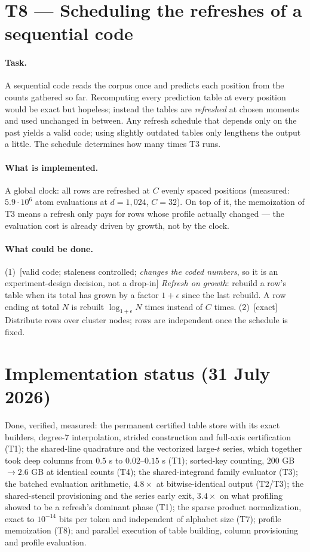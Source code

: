 \documentclass[11pt]{article}
\newcommand{\field}[1]{\paragraph{#1.}}
\begin{document}
\section{T8 --- Scheduling the refreshes of a sequential code}

\field{Task}
A sequential code reads the corpus once and predicts each position
from the counts gathered so far.  Recomputing every prediction table
at every position would be exact but hopeless; instead the tables
are \emph{refreshed} at chosen moments and used unchanged in
between.  Any refresh schedule that depends only on the past yields
a valid code; using slightly outdated tables only lengthens the
output a little.  The schedule determines how many times T3 runs.

\field{What is implemented}
A global clock: all rows are refreshed at $C$ evenly spaced
positions (measured: $5.9\cdot 10^6$ atom evaluations at
$d = 1{,}024$, $C = 32$).  On top of it, the memoization of T3 means
a refresh only pays for rows whose profile actually changed --- the
evaluation cost is already driven by growth, not by the clock.

\field{What could be done}
(1)~[valid code; staleness controlled; \emph{changes the coded
numbers}, so it is an experiment-design decision, not a drop-in]
\emph{Refresh on growth}: rebuild a row's table when its total has
grown by a factor $1+\epsilon$ since the last rebuild.  A row ending
at total $N$ is rebuilt $\log_{1+\epsilon} N$ times instead of $C$
times.
(2)~[exact] Distribute rows over cluster nodes; rows are independent
once the schedule is fixed.

\section*{Implementation status (31 July 2026)}

Done, verified, measured: the permanent certified table store with
its exact builders, degree-$7$ interpolation, strided construction
and full-axis certification (T1); the shared-line quadrature and the
vectorized large-$t$ series, which together took deep columns from
$0.5$ s to $0.02$--$0.15$ s (T1); sorted-key counting, $200$ GB
$\to 2.6$ GB at identical counts (T4); the shared-integrand family
evaluator (T3); the batched evaluation arithmetic, $4.8\times$ at
bitwise-identical output (T2/T3); the shared-stencil provisioning and
the series early exit, $3.4\times$ on what profiling showed to be a
refresh's dominant phase (T1); the sparse product normalization,
exact to $10^{-14}$ bits per token and independent of alphabet size
(T7); profile memoization (T8); and parallel execution of table
building, column provisioning and profile evaluation.
\end{document}
